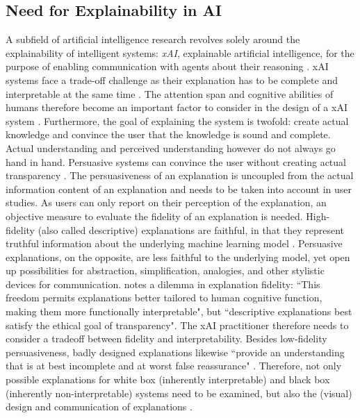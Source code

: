 \subsection{Need for Explainability in AI}
\label{subsec:explainability}
A subfield of artificial intelligence research revolves solely around the explainability of intelligent systems: \textit{xAI}, explainable artificial intelligence, for the purpose of enabling communication with agents about their reasoning \cite{hendricks2018generating}. xAI systems face a trade-off challenge as their explanation has to be complete and interpretable at the same time \cite{gilpin2018explaining}. The attention span and cognitive abilities of humans therefore become an important factor to consider in the design of a xAI system \cite{kulesza2013too}. Furthermore, the goal of explaining the system is twofold: create actual knowledge and convince the user that the knowledge is sound and complete. Actual understanding and perceived understanding however do not always go hand in hand. Persuasive systems can convince the user without creating actual transparency \cite{gilpin2018explaining}. The persuasiveness of an explanation is uncoupled from the actual information content of an explanation \cite{biran2017explanation} and needs to be taken into account in user studies. As users can only report on their perception of the explanation, an objective measure to evaluate the fidelity of an explanation is needed. High-fidelity (also called descriptive) explanations are faithful, in that they represent truthful information about the underlying machine learning model \cite{herman2017promise}. Persuasive explanations, on the opposite, are less faithful to the underlying model, yet open up possibilities for abstraction, simplification, analogies, and other stylistic devices for communication. \cite{herman2017promise} notes a dilemma in explanation fidelity: ``This freedom permits explanations better tailored to human cognitive function, making them more functionally interpretable", but ``descriptive explanations best satisfy the ethical goal of transparency". The xAI practitioner therefore needs to consider a tradeoff between fidelity and interpretability. \newline 
Besides low-fidelity persuasiveness, badly designed explanations likewise ``provide an understanding that is at best incomplete and at worst false reassurance" \cite{burrell2016machine}. Therefore, not only possible explanations for white box (inherently interpretable) and black box (inherently non-interpretable) systems need to be examined, but also the (visual) design and communication of explanations \cite{guidotti2018survey}. \newline
